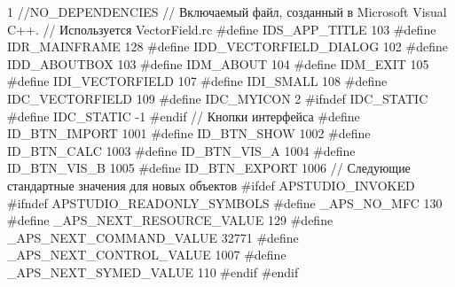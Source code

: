 \begin{listing}{1}
//{{NO_DEPENDENCIES}}
// Включаемый файл, созданный в Microsoft Visual C++.
// Используется VectorField.rc
#define IDS_APP_TITLE           103
#define IDR_MAINFRAME           128
#define IDD_VECTORFIELD_DIALOG  102
#define IDD_ABOUTBOX            103
#define IDM_ABOUT               104
#define IDM_EXIT                105
#define IDI_VECTORFIELD         107
#define IDI_SMALL               108
#define IDC_VECTORFIELD         109
#define IDC_MYICON              2
#ifndef IDC_STATIC
#define IDC_STATIC              -1
#endif
// Кнопки интерфейса
#define ID_BTN_IMPORT           1001
#define ID_BTN_SHOW             1002
#define ID_BTN_CALC             1003
#define ID_BTN_VIS_A            1004
#define ID_BTN_VIS_B            1005
#define ID_BTN_EXPORT           1006
// Следующие стандартные значения для новых объектов
#ifdef APSTUDIO_INVOKED
#ifndef APSTUDIO_READONLY_SYMBOLS
#define _APS_NO_MFC             130
#define _APS_NEXT_RESOURCE_VALUE 129
#define _APS_NEXT_COMMAND_VALUE 32771
#define _APS_NEXT_CONTROL_VALUE 1007
#define _APS_NEXT_SYMED_VALUE   110
#endif
#endif
\end{listing}
\normalsize

\pagebreak

